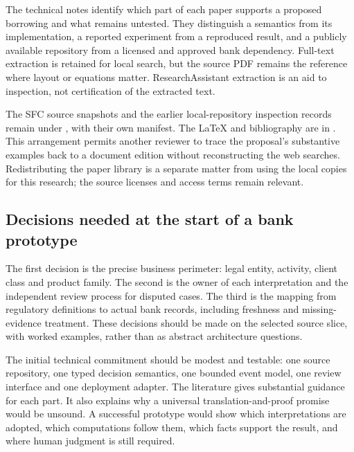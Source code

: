 The technical notes identify which part of each paper supports a proposed
borrowing and what remains untested. They distinguish a semantics from its
implementation, a reported experiment from a reproduced result, and a publicly
available repository from a licensed and approved bank dependency. Full-text
extraction is retained for local search, but the source PDF remains the reference
where layout or equations matter. ResearchAssistant extraction is an aid to
inspection, not certification of the extracted text.

The SFC source snapshots and the earlier local-repository inspection records
remain under , with their own manifest. The LaTeX and
bibliography are in . This arrangement permits another
reviewer to trace the proposal's substantive examples back to a document edition
without reconstructing the web searches. Redistributing the paper library is a
separate matter from using the local copies for this research; the source licenses
and access terms remain relevant.

\subsection{Decisions needed at the start of a bank prototype}

The first decision is the precise business perimeter: legal entity, activity,
client class and product family. The second is the owner of each interpretation
and the independent review process for disputed cases. The third is the mapping
from regulatory definitions to actual bank records, including freshness and
missing-evidence treatment. These decisions should be made on the selected source
slice, with worked examples, rather than as abstract architecture questions.

The initial technical commitment should be modest and testable: one source
repository, one typed decision semantics, one bounded event model, one review
interface and one deployment adapter. The literature gives substantial guidance
for each part. It also explains why a universal translation-and-proof promise
would be unsound. A successful prototype would show which interpretations are
adopted, which computations follow them, which facts support the result, and where
human judgment is still required.
